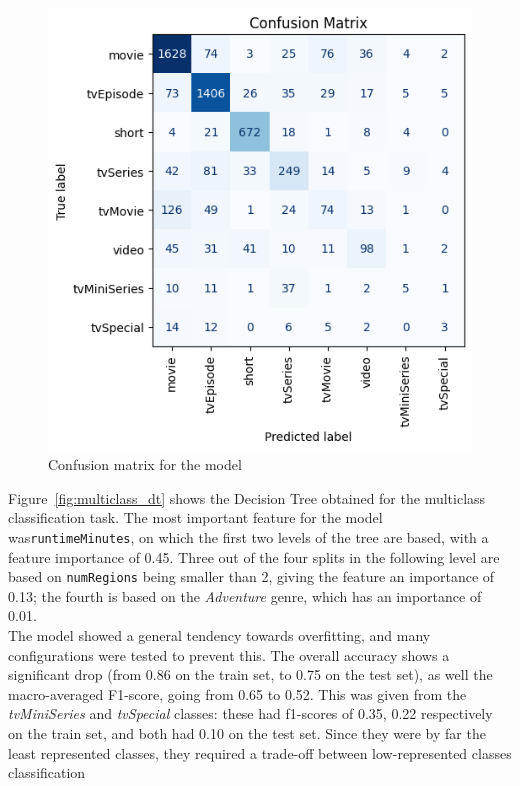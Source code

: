 \begin{figure}
    \centering
    \captionsetup{justification=raggedleft, width=1\linewidth}
    \caption{Confusion matrix for the model}
    \label{fig:multiclass_dt_conf_matrix}
    \includegraphics[width=0.9\linewidth]{plots/multiclass_dt_conf_matrix.png}
\end{figure}
Figure~\ref{fig:multiclass_dt} shows the Decision Tree obtained for the multiclass classification task.
The most important feature for the model was\texttt{runtimeMinutes}, on which the first two levels
of the tree are based, with a feature importance of 0.45.
Three out of the four splits in the following level are based on \texttt{numRegions} being smaller than
2, giving the feature an importance of 0.13; the fourth is based on the \textit{Adventure} genre,
which has an importance of 0.01.\\
The model showed a general tendency towards overfitting, and many configurations were tested to prevent
this.
The overall accuracy shows a significant drop (from 0.86 on the train set, to 0.75 on the test set),
as well the macro-averaged F1-score, going from 0.65 to 0.52.
This was given from the \textit{tvMiniSeries} and \textit{tvSpecial} classes: these had f1-scores of
0.35, 0.22 respectively on the train set, and both had 0.10 on the test set. Since they were by far
the least represented classes, they required a trade-off between low-represented classes classification
